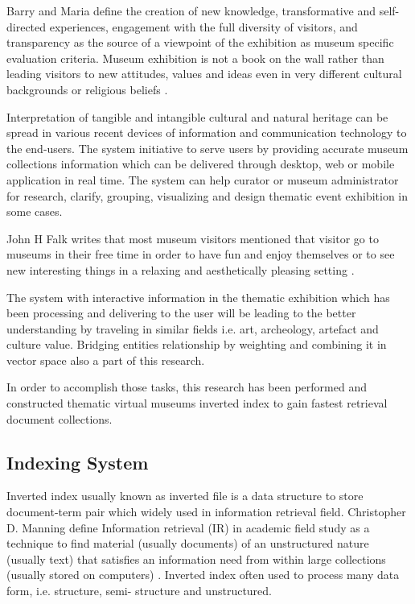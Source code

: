 Barry and Maria define the creation of new knowledge, transformative and self-directed experiences, engagement with the full diversity of visitors, and transparency as the source of a viewpoint of the exhibition as museum specific evaluation criteria. Museum exhibition is not a book on the wall rather than leading visitors to new attitudes, values and ideas even in very different cultural backgrounds or religious beliefs \cite{LordPiacente}.

Interpretation of tangible and intangible cultural and natural heritage can be spread in various recent devices of information and communication technology to the end-users. The system initiative to serve users by providing accurate museum collections information which can be delivered through desktop, web or mobile application in real time. The system can help curator or museum administrator for research, clarify, grouping, visualizing and design thematic event exhibition in some cases.

John H Falk writes that most museum visitors mentioned that visitor go to museums in their free time in order to have fun and enjoy themselves or to see new interesting things in a relaxing and aesthetically pleasing setting \cite{Falk}.

The system with interactive information in the thematic exhibition which has been processing and delivering to the user will be leading to the better understanding by traveling in similar fields i.e. art, archeology, artefact and culture value. Bridging entities relationship by weighting and combining it in vector space also a part of this research.

In order to accomplish those tasks, this research has been performed and constructed thematic virtual museums inverted index to gain fastest retrieval document collections.

\subsection{Indexing System}

Inverted index usually known as inverted file is a data structure to store document-term pair which widely used in information retrieval field. Christopher D. Manning define Information retrieval (IR) in academic field study as a technique to find material (usually documents) of an unstructured nature (usually text) that satisfies an information need from within large collections (usually stored on computers) \cite{ManningRaghavanSchutze}. Inverted index often used to process many data form, i.e. structure, semi- structure and unstructured.

